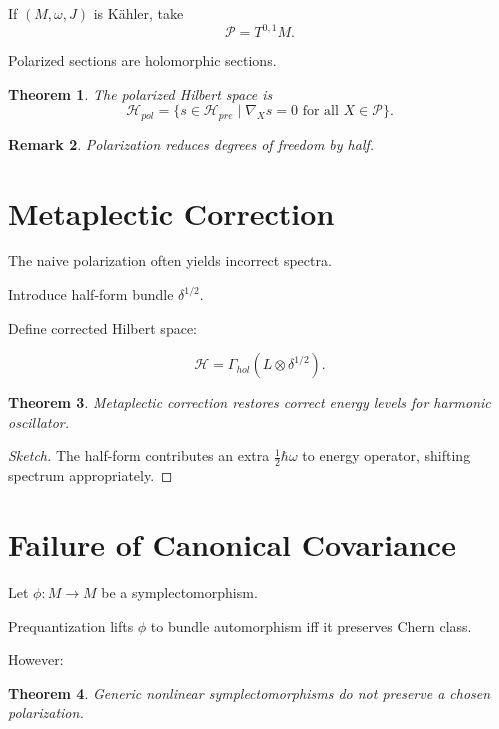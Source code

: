 \documentclass[11pt]{book}
\newtheorem{theorem}{Theorem}[chapter]
\newtheorem{remark}[theorem]{Remark}
\begin{document}
If $(M,\omega,J)$ is Kähler,
take
\[
\mathcal{P} = T^{0,1}M.
\]

Polarized sections are holomorphic sections.

\begin{theorem}
The polarized Hilbert space is
\[
\mathcal{H}_{pol}
=
\{ s \in \mathcal{H}_{pre} \mid \nabla_X s = 0
\text{ for all } X \in \mathcal{P} \}.
\]
\end{theorem}

\begin{remark}
Polarization reduces degrees of freedom by half.
\end{remark}

\section{Metaplectic Correction}

The naive polarization often yields incorrect spectra.

Introduce half-form bundle $\delta^{1/2}$.

Define corrected Hilbert space:

\[
\mathcal{H}
=
\Gamma_{hol}(L \otimes \delta^{1/2}).
\]

\begin{theorem}
Metaplectic correction restores correct energy levels
for harmonic oscillator.
\end{theorem}

\begin{proof}[Sketch]
The half-form contributes an extra $\frac12 \hbar \omega$
to energy operator, shifting spectrum appropriately.
\end{proof}

\section{Failure of Canonical Covariance}

Let $\phi: M \to M$ be a symplectomorphism.

Prequantization lifts $\phi$ to bundle automorphism
iff it preserves Chern class.

However:

\begin{theorem}
Generic nonlinear symplectomorphisms
do not preserve a chosen polarization.
\end{theorem}
\end{document}
